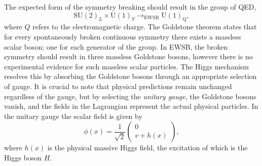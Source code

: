 The expected form of the symmetry breaking should result in the group of QED,
\begin{equation}
    \text{SU}(2)_L \times \text{U}(1)_Y \rightarrow_\text{EWSB} \text{U}(1)_\text{Q},
\end{equation}
where $Q$ refers to the electromagnetic charge.
The Goldstone theorem states that for every spontaneously broken continuous symmetry there exists a massless scalar boson; one for each generator of the group.
In EWSB, the broken symmetry should result in three massless Goldstone bosons, however there is no experimental evidence for such massless scalar particles.
The Higgs mechanism resolves this by absorbing the Goldstone bosons through an appropriate selection of gauge.
It is crucial to note that physical predictions remain unchanged regardless of the gauge, but by selecting the \textit{unitary gauge}, the Goldstone bosons vanish, and the fields in the Lagrangian represent the actual physical particles.
In the unitary gauge the scalar field is given by
\begin{equation}
    \label{eq:higgs_unitary_gauge}
    \phi(x) = \frac{1}{\sqrt{2}} \begin{pmatrix} 0 \\ v + h(x) \end{pmatrix},
\end{equation}
where $h(x)$ is the physical massive Higgs field, the excitation of which is the Higgs boson $H$.


